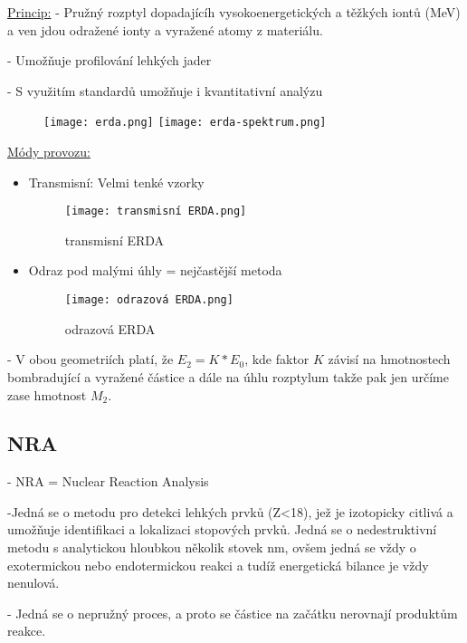 \underline{Princip:}
- Pružný rozptyl dopadajícíh vysokoenergetických a těžkých iontů (MeV) a ven jdou odražené ionty a vyražené atomy z materiálu.

- Umožňuje profilování lehkých jader

- S využitím standardů umožňuje i kvantitativní analýzu

\begin{figure}[ht!]
	\texttt{[image: erda.png]}
	\texttt{[image: erda-spektrum.png]}
\end{figure}

\underline{Módy provozu:}

\begin{itemize}
    \item Transmisní: Velmi tenké vzorky

    \begin{figure}[ht!]
        \centering
        \texttt{[image: transmisní ERDA.png]}
        \caption{transmisní ERDA}
    \end{figure}

    \item Odraz pod malými úhly = nejčastější metoda

    \begin{figure}[ht!]
        \centering
        \texttt{[image: odrazová ERDA.png]}
        \caption{odrazová ERDA}
    \end{figure}
\end{itemize}

- V obou geometriích platí, že $E_2 = K * E_0$, kde faktor $K$ závisí na hmotnostech bombradující a vyražené částice a dále na úhlu rozptylum takže pak jen určíme zase hmotnost $M_2$.



\subsection{NRA}
- NRA = Nuclear Reaction Analysis

-Jedná se o metodu pro detekci lehkých prvků (Z<18), jež je izotopicky citlivá a umožňuje identifikaci a lokalizaci stopových prvků. Jedná se o nedestruktivní metodu s analytickou hloubkou několik stovek nm, ovšem jedná se vždy o exotermickou nebo endotermickou reakci a tudíž energetická bilance je vždy nenulová.

- Jedná se o nepružný proces, a proto se částice na začátku nerovnají produktům reakce.

